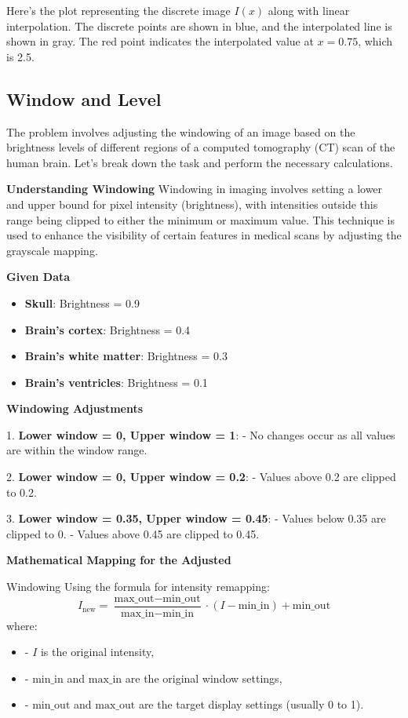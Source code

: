 \documentclass{article}
\begin{document}
Here's the plot representing the discrete image \( I(x) \) along with linear interpolation. The discrete points are shown in blue, and the interpolated line is shown in gray. The red point indicates the interpolated value at \( x = 0.75 \), which is 2.5.

\subsection{Window and Level}

The problem involves adjusting the windowing of an image based on the brightness levels of different regions of a computed tomography (CT) scan of the human brain. Let's break down the task and perform the necessary calculations.

\textbf{Understanding Windowing}
Windowing in imaging involves setting a lower and upper bound for pixel intensity (brightness), with intensities outside this range being clipped to either the minimum or maximum value. This technique is used to enhance the visibility of certain features in medical scans by adjusting the grayscale mapping.

\textbf{Given Data}
\begin{itemize}
    \item \textbf{Skull}: Brightness = 0.9
    \item \textbf{Brain's cortex}: Brightness = 0.4
    \item \textbf{Brain's white matter}: Brightness = 0.3
    \item \textbf{Brain's ventricles}: Brightness = 0.1
\end{itemize}

\textbf{Windowing Adjustments}

1. \textbf{Lower window = 0, Upper window = 1}: 
   - No changes occur as all values are within the window range.

2. \textbf{Lower window = 0, Upper window = 0.2}: 
   - Values above 0.2 are clipped to 0.2.

3. \textbf{Lower window = 0.35, Upper window = 0.45}: 
   - Values below 0.35 are clipped to 0.
   - Values above 0.45 are clipped to 0.45.

\textbf{Mathematical Mapping for the Adjusted }

Windowing
Using the formula for intensity remapping:
\[ I_{\text{new}} = \frac{\text{max\_out} - \text{min\_out}}{\text{max\_in} - \text{min\_in}} \cdot (I - \text{min\_in}) + \text{min\_out} \]
where:
\begin{itemize}
    \item - \( I \) is the original intensity,
    \item - \( \text{min\_in} \) and \( \text{max\_in} \) are the original window settings,
    \item - \( \text{min\_out} \) and \( \text{max\_out} \) are the target display settings (usually 0 to 1).
\end{itemize}
\end{document}
